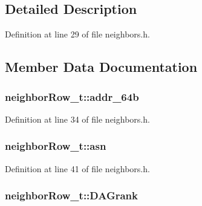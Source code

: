 \subsection{Detailed Description}


Definition at line 29 of file neighbors.\+h.



\subsection{Member Data Documentation}
\subsubsection[{\texorpdfstring{addr\+\_\+64b}{addr_64b}}]{ neighbor\+Row\+\_\+t\+::addr\+\_\+64b}\hypertarget{structneighbor_row__t_ad1f8fd4f98531eb454c37204e7a03f66}{}\label{structneighbor_row__t_ad1f8fd4f98531eb454c37204e7a03f66}


Definition at line 34 of file neighbors.\+h.

\subsubsection[{\texorpdfstring{asn}{asn}}]{ neighbor\+Row\+\_\+t\+::asn}\hypertarget{structneighbor_row__t_af7a02d223c38539667aead0fe666907b}{}\label{structneighbor_row__t_af7a02d223c38539667aead0fe666907b}


Definition at line 41 of file neighbors.\+h.

\subsubsection[{\texorpdfstring{D\+A\+Grank}{DAGrank}}]{ neighbor\+Row\+\_\+t\+::\+D\+A\+Grank}\hypertarget{structneighbor_row__t_a1678b7967801f6e5f3d8822d744fba55}{}\label{structneighbor_row__t_a1678b7967801f6e5f3d8822d744fba55}


